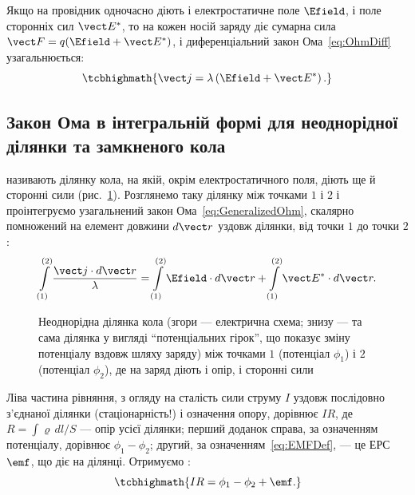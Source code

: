 Якщо на провідник одночасно діють і електростатичне поле $\Efield$, і поле сторонніх сил $\vect E^*$, то на кожен носій заряду діє
сумарна сила $\vect F = q(\Efield + \vect E^*)$, і диференціальний закон Ома~\eqref{eq:OhmDiff} узагальнюється:
\begin{equation}\label{eq:GeneralizedOhm}
	\tcbhighmath{
		\vect j = \lambda\left(\Efield + \vect E^*\right).
	}
\end{equation}

\subsection*{Закон Ома в інтегральній формі для неоднорідної ділянки та замкненого кола}

 називають ділянку кола, на якій, окрім електростатичного поля, діють ще й сторонні сили (рис.~\ref{pic:OhmLaw}). Розглянемо
таку ділянку між точками $1$ і $2$ і проінтегруємо узагальнений закон Ома~\eqref{eq:GeneralizedOhm}, скалярно помножений на елемент довжини $d\vect
r$ уздовж ділянки, від точки $1$ до точки $2$:
\begin{equation*}
	\int\limits_{(1)}^{(2)} \frac{\vect j\cdot d\vect r}{\lambda} = \int\limits_{(1)}^{(2)} \Efield\cdot d\vect r + \int\limits_{(1)}^{(2)} \vect
	E^*\cdot d\vect r.
\end{equation*}

\begin{figure}\centering
    \caption{Неоднорідна ділянка кола (згори --- електрична схема; знизу --- та сама ділянка у вигляді
    \enquote{потенціальних гірок}, що показує зміну потенціалу вздовж шляху заряду) між точками $1$ (потенціал $\phi_1$) і $2$
    (потенціал $\phi_2$), де на заряд діють і опір, і сторонні сили\label{pic:OhmLaw}}
\end{figure}

Ліва частина рівняння, з огляду на сталість сили струму $I$ уздовж послідовно з'єднаної ділянки (стаціонарність!) і означення опору, дорівнює $IR$, де
$R = \int \varrho\, dl/S$ --- опір усієї ділянки; перший доданок справа, за означенням потенціалу, дорівнює $\phi_1 - \phi_2$; другий, за
означенням~\eqref{eq:EMFDef}, --- це ЕРС $\emf$, що діє на ділянці. Отримуємо :
\begin{equation}\label{eq:OhmNonUniform}
	\tcbhighmath{
		IR = \phi_1 - \phi_2 + \emf.
	}
\end{equation}

